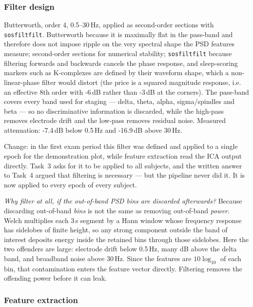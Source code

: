 \documentclass[11pt,a4paper]{article}
\newcommand{\hertz}{Hz}
\newcommand{\second}{s}
\newcommand{\decibel}{dB}
\newcommand{\SI}[2]{#1\,#2}
\newcommand{\SIrange}[3]{#1--#2\,#3}
\newcommand{\change}[1]{\textcolor{black!70}{\textsf{\footnotesize #1}}}
\begin{document}
\subsubsection{Filter design}
\label{sec:p2filt}

Butterworth, order 4, \SIrange{0.5}{30}{\hertz}, applied as second-order sections with
\texttt{sosfiltfilt}. Butterworth because it is maximally flat in the pass-band and therefore
does not impose ripple on the very spectral shape the PSD features measure; second-order
sections for numerical stability; \texttt{sosfiltfilt} because filtering forwards and backwards
cancels the phase response, and sleep-scoring markers such as K-complexes are defined by their
waveform shape, which a non-linear-phase filter would distort (the price is a squared magnitude
response, i.e. an effective 8th order with \SI{-6}{\decibel} rather than \SI{-3}{\decibel} at
the corners). The pass-band covers every band used for staging --- delta, theta, alpha,
sigma/spindles and beta --- so no discriminative information is discarded, while the high-pass
removes electrode drift and the low-pass removes residual noise. Measured attenuation:
\SI{-7.4}{\decibel} below \SI{0.5}{\hertz} and \SI{-16.9}{\decibel} above \SI{30}{\hertz}.

\change{Change: in the first exam period this filter was defined and applied to a single epoch
for the demonstration plot, while feature extraction read the ICA output directly. Task~3 asks
for it to be applied to all subjects, and the written answer to Task~4 argued that filtering is
necessary --- but the pipeline never did it. It is now applied to every epoch of every subject.}

\emph{Why filter at all, if the out-of-band PSD bins are discarded afterwards?} Because
discarding out-of-band \emph{bins} is not the same as removing out-of-band \emph{power}. Welch
multiplies each \SI{3}{\second} segment by a Hann window whose frequency response has sidelobes
of finite height, so any strong component outside the band of interest deposits energy inside
the retained bins through those sidelobes. Here the two offenders are large: electrode drift
below \SI{0.5}{\hertz}, many dB above the delta band, and broadband noise above
\SI{30}{\hertz}. Since the features are $10\log_{10}$ of each bin, that contamination enters the
feature vector directly. Filtering removes the offending power before it can leak.

\subsubsection{Feature extraction}
\label{sec:p2feat}
\end{document}
